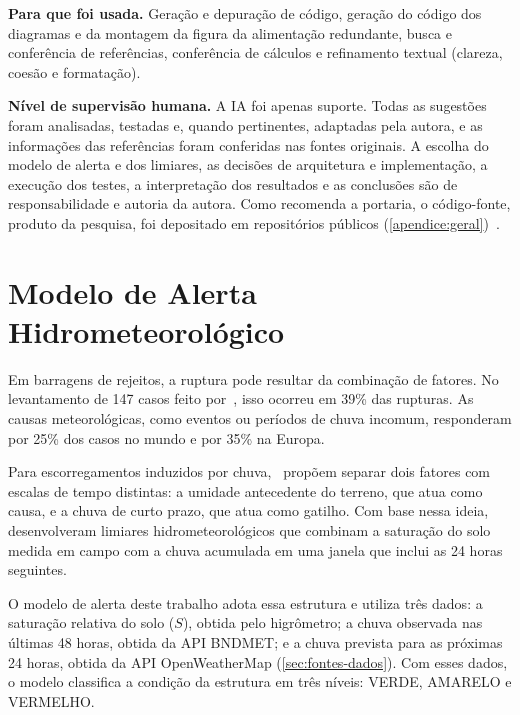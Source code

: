 \textbf{Para que foi usada.} Geração e depuração de código, geração do
código dos diagramas e da montagem da figura da alimentação redundante, busca e conferência de referências, conferência de
cálculos e refinamento textual (clareza, coesão e formatação).

\textbf{Nível de supervisão humana.} A IA foi apenas suporte. Todas as
sugestões foram analisadas, testadas e, quando pertinentes, adaptadas
pela autora, e as informações das referências foram conferidas nas
fontes originais. A escolha do modelo de alerta e dos limiares, as
decisões de arquitetura e implementação, a execução dos testes, a
interpretação dos resultados e as conclusões são de responsabilidade e
autoria da autora. Como recomenda a portaria, o código-fonte, produto da
pesquisa, foi depositado em repositórios públicos
(\autoref{apendice:geral})~\cite[art.~9º, I, g]{cnpq2026portaria2664}.

\section{Modelo de Alerta Hidrometeorológico}
\label{sec:modelo-risco}

Em barragens de rejeitos, a ruptura pode resultar da combinação de
fatores. No levantamento de 147 casos feito por~, isso ocorreu em 39\% das rupturas.
As causas meteorológicas, como
eventos ou períodos de chuva incomum, responderam por 25\% dos casos
no mundo e por 35\% na Europa.

Para escorregamentos induzidos por chuva,~ propõem separar dois fatores com
escalas de tempo distintas: a umidade antecedente do terreno, que atua
como causa, e a chuva de curto prazo, que atua como gatilho. Com base
nessa ideia,~ desenvolveram limiares
hidrometeorológicos que combinam a saturação do solo medida em campo
com a chuva acumulada em uma janela que inclui as 24 horas seguintes.

O modelo de alerta deste trabalho adota essa estrutura e utiliza três
dados: a saturação relativa do solo ($S$), obtida pelo higrômetro; a
chuva observada nas últimas 48 horas, obtida da API BNDMET; e a chuva
prevista para as próximas 24 horas, obtida da API OpenWeatherMap
(\autoref{sec:fontes-dados}). Com esses dados, o modelo classifica a
condição da estrutura em três níveis: VERDE, AMARELO e VERMELHO.

